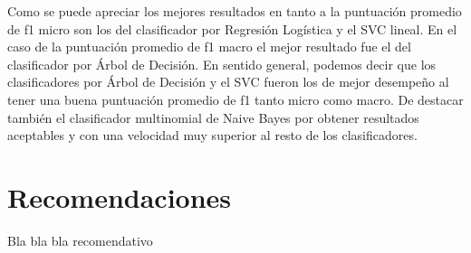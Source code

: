 \documentclass[12pt]{llncs}
\begin{document}
\par Como se puede apreciar los mejores resultados en tanto a la puntuación promedio de f1 micro son los del clasificador por Regresión Logística y el SVC lineal. En el caso de la puntuación promedio de f1 macro el mejor resultado fue el del clasificador por Árbol de Decisión. En sentido general, podemos decir que los clasificadores por Árbol de Decisión y el SVC fueron los de mejor desempeño al tener una buena puntuación promedio de f1 tanto micro como macro. De destacar también el clasificador multinomial de Naive Bayes por  obtener resultados aceptables y con una velocidad muy superior al resto de los clasificadores.


\section*{Recomendaciones}

Bla bla bla recomendativo


 

\end{document}
